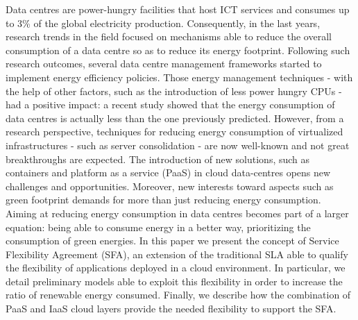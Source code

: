 

Data centres are power-hungry facilities that host ICT services and consumes up to 3\% of the global electricity production.
Consequently, in the last years, research trends in the field focused on mechanisms able to reduce the overall consumption of a data centre so as to reduce its energy footprint.
Following such research outcomes, several data centre management frameworks started to implement energy efficiency policies.
Those energy management techniques - with the help of other factors, such as the introduction of less power hungry CPUs - had a positive impact: a recent study showed that the energy consumption of data centres is actually less than the one previously predicted.
However, from a research perspective, techniques for reducing energy consumption of virtualized infrastructures - such as server consolidation - are now well-known and not great breakthroughs are expected.
The introduction of new solutions, such as containers and platform as a service (PaaS) in cloud data-centres opens new challenges and opportunities.
Moreover, new interests toward aspects such as green footprint demands for more than just reducing energy consumption. 
Aiming at reducing energy consumption in data centres becomes part of a larger equation: being able to consume energy in a better way, prioritizing the consumption of green energies.
In this paper we present the concept of Service Flexibility Agreement (SFA), an extension of the traditional SLA able to qualify the flexibility of applications deployed in a cloud environment.
In particular, we detail preliminary models able to exploit this flexibility in order to increase the ratio of renewable energy consumed.
Finally, we describe how the combination of PaaS and IaaS cloud layers provide the needed flexibility to support the SFA.
